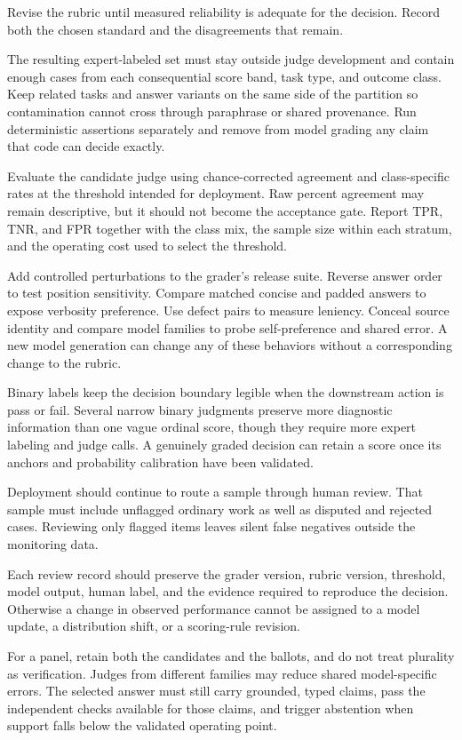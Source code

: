 Revise the rubric until measured reliability is adequate for the decision. Record both the chosen standard and the disagreements that remain.

The resulting expert-labeled set must stay outside judge development and contain enough cases from each consequential score band, task type, and outcome class. Keep related tasks and answer variants on the same side of the partition so contamination cannot cross through paraphrase or shared provenance. Run deterministic assertions separately and remove from model grading any claim that code can decide exactly.

Evaluate the candidate judge using chance-corrected agreement and class-specific rates at the threshold intended for deployment. Raw percent agreement may remain descriptive, but it should not become the acceptance gate. Report TPR, TNR, and FPR together with the class mix, the sample size within each stratum, and the operating cost used to select the threshold.

Add controlled perturbations to the grader's release suite. Reverse answer order to test position sensitivity. Compare matched concise and padded answers to expose verbosity preference. Use defect pairs to measure leniency. Conceal source identity and compare model families to probe self-preference and shared error. A new model generation can change any of these behaviors without a corresponding change to the rubric.

Binary labels keep the decision boundary legible when the downstream action is pass or fail. Several narrow binary judgments preserve more diagnostic information than one vague ordinal score, though they require more expert labeling and judge calls. A genuinely graded decision can retain a score once its anchors and probability calibration have been validated.

Deployment should continue to route a sample through human review. That sample must include unflagged ordinary work as well as disputed and rejected cases. Reviewing only flagged items leaves silent false negatives outside the monitoring data.

Each review record should preserve the grader version, rubric version, threshold, model output, human label, and the evidence required to reproduce the decision. Otherwise a change in observed performance cannot be assigned to a model update, a distribution shift, or a scoring-rule revision.

For a panel, retain both the candidates and the ballots, and do not treat plurality as verification. Judges from different families may reduce shared model-specific errors. The selected answer must still carry grounded, typed claims, pass the independent checks available for those claims, and trigger abstention when support falls below the validated operating point.

